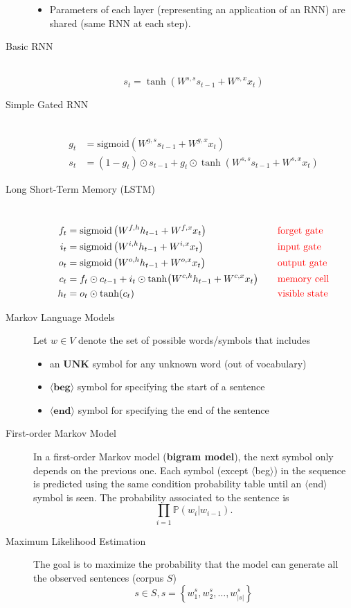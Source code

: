 \documentclass[10pt,landscape,a4paper]{article}
\begin{document}
\begin{multicols*}{3}
\begin{description}
\begin{itemize}
		\item Parameters of each layer (representing an application of an RNN) are shared (same RNN at each step).
	\end{itemize}
	\item[Basic RNN] ~
	$$s_t=\tanh(W^{s,s}s_{t-1} + W^{s,x}x_t)$$
	\item[Simple Gated RNN] ~
	\begin{align*}
		g_t&=\text{sigmoid}\left(W^{g,s}s_{t-1}+W^{g,x}x_t\right)\\
		s_t&=\left(1-g_t\right)\odot s_{t-1}+g_t\odot\tanh(W^{s,s}s_{t-1}+W^{s,x}x_t)
	\end{align*}
	\item[Long Short-Term Memory (LSTM)] ~
	\begin{alignat*}{2}
		f_t&=\text{sigmoid}\left(W^{f,h}h_{t-1}+W^{f,x}x_t\right)\quad&&\textcolor{red}{\text{forget gate}}\\
		i_t&=\text{sigmoid}\left(W^{i,h}h_{t-1}+W^{i,x}x_t\right) &&\textcolor{red}{\text{input gate}}\\
		o_t&=\text{sigmoid}\left(W^{o,h}h_{t-1}+W^{o,x}x_t\right) &&\textcolor{red}{\text{output gate}}\\
		c_t&=f_t\odot c_{t-1}+i_t\odot\tanh(W^{c,h}h_{t-1}+W^{c,x}x_t) \quad&&\textcolor{red}{\text{memory cell}}\\
		h_t&=o_t\odot\tanh(c_t)&&\textcolor{red}{\text{visible state}}
	\end{alignat*}	
	\item[Markov Language Models] Let $w\in V$ denote the set of possible words/symbols that includes
	\begin{itemize}
		\item an $\mathbf{UNK}$ symbol for any unknown word (out of vocabulary)
		\item $\mathbf{\langle beg\rangle}$ symbol for specifying the start of a sentence
		\item $\mathbf{\langle end\rangle}$ symbol for specifying the end of the sentence
	\end{itemize}
	\item[First-order Markov Model] In a first-order Markov model ({\bf bigram model}), the next symbol only depends on the previous one. Each symbol (except $\langle$beg$\rangle$) in the sequence is predicted using the same condition probability table until an $\langle$end$\rangle$ symbol is seen. The probability associated to the sentence is
	$$\prod_{i=1}\mathbb{P}\left(w_i|w_{i-1}\right).$$
	\item[Maximum Likelihood Estimation] The goal is to maximize the probability that the model can generate all the observed sentences (corpus $S$) $$s\in S, s=\left\{w_1^s,w_2^s,\dots,w_{|s|}^s\right\}$$

\end{description}
\end{multicols*}
\end{document}

